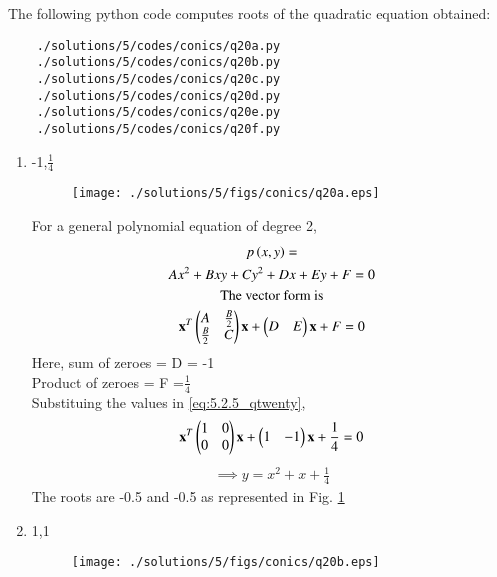 The following python code computes roots of the quadratic equation obtained:
	\begin{lstlisting}
	./solutions/5/codes/conics/q20a.py
	./solutions/5/codes/conics/q20b.py
	./solutions/5/codes/conics/q20c.py
	./solutions/5/codes/conics/q20d.py
	./solutions/5/codes/conics/q20e.py
	./solutions/5/codes/conics/q20f.py
	\end{lstlisting}
	
	\begin{enumerate}
	
		\item -1,$\frac{1}{4}$
	\begin{figure}[!ht]
	\centering
	\texttt{[image: ./solutions/5/figs/conics/q20a.eps]}
	\caption{}
	\label{fig:5.2.5_qtoa}	
	\end{figure}
	
		 For a general polynomial equation of degree 2,
	\begin{multline}
	p\left(x,y\right) =
\\
 Ax^2 +Bxy + Cy^2 +Dx + Ey + F = 0\\
	\text{The vector form is}\\
	\mathbf{x}^T\begin{pmatrix}A&\frac{B}{2}\\\frac{B}{2}&C\end{pmatrix}\mathbf{x}  + \begin{pmatrix}D&E\end{pmatrix}\mathbf{x} + F = 0 \label{eq:5.2.5_qtwenty}
	\end{multline}
Here, sum of zeroes = D = -1\\
Product of zeroes = F =$\frac{1}{4}$\\
Substituing the values in \ref{eq:5.2.5_qtwenty},\\
\begin{multline}
\mathbf{x}^T\begin{pmatrix}1&0\\0&0\end{pmatrix}\mathbf{x}  + 
\begin{pmatrix}1&-1\end{pmatrix}\mathbf{x} +\frac{1}{4} = 0\\
\end{multline}
\begin{align}
\implies y = x^2 + x + \frac{1}{4}
\end{align}
The roots are -0.5 and -0.5 as represented in Fig. \ref{fig:5.2.5_qtoa}
		
		\item 1,1
	\begin{figure}[!ht]
	\centering
	\texttt{[image: ./solutions/5/figs/conics/q20b.eps]}
	\caption{}
	\label{fig:5.2.5_qtob}	
	\end{figure}
	

\end{enumerate}
